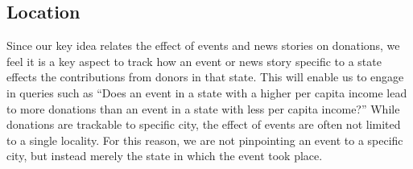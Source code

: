 \documentclass[12pt]{article}
\begin{document}
    \subsection{Location}
    Since our key idea relates the effect of events and news stories on donations, we feel it is a key aspect to track how an event or news story specific to a state effects the contributions from donors in that state. This will enable us to engage in queries such as ``Does an event in a state with a higher per capita income lead to more donations than an event in a state with less per capita income?'' While donations are trackable to specific city, the effect of events are often not limited to a single locality. For this reason, we are not pinpointing an event to a specific city, but instead merely the state in which the event took place. 
\end{document}
